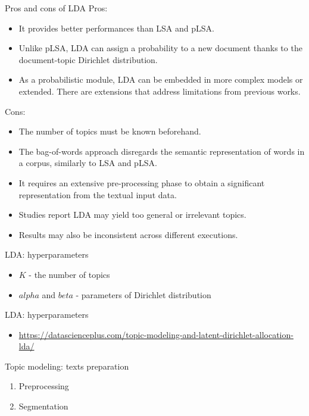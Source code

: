 \documentclass[svgnames]{beamer}
\begin{document}
    \begin{frame}{Pros and cons of LDA}
        Pros:
        \begin{itemize}
            \item It provides better performances than LSA and pLSA.
            \item Unlike pLSA, LDA can assign a probability to a new document thanks to the document-topic Dirichlet distribution.
            \item As a probabilistic module, LDA can be embedded in more complex models or extended. There are extensions that address limitations from previous works.
        \end{itemize}
        Cons:
        \begin{itemize}
            \item The number of topics must be known beforehand.
            \item The bag-of-words approach disregards the semantic representation of words in a corpus, similarly to LSA and pLSA.
            \item It requires an extensive pre-processing phase to obtain a significant representation from the textual input data.
            \item Studies report LDA may yield too general or irrelevant topics.
            \item Results may also be inconsistent across different executions.
        \end{itemize}
    \end{frame}

    \begin{frame}{LDA: hyperparameters}
        \begin{itemize}
            \item $K$ - the number of topics
            \item $alpha$ and $beta$ - parameters of Dirichlet distribution
        \end{itemize}
    \end{frame}

    \begin{frame}{LDA: hyperparameters}
        \begin{itemize}
            \item \url{https://datascienceplus.com/topic-modeling-and-latent-dirichlet-allocation-lda/}
        \end{itemize}
    \end{frame}

    \begin{frame}{Topic modeling: texts preparation}
        \begin{enumerate}
            \item Preprocessing
            \item Segmentation
        \end{enumerate}
    \end{frame}
\end{document}
